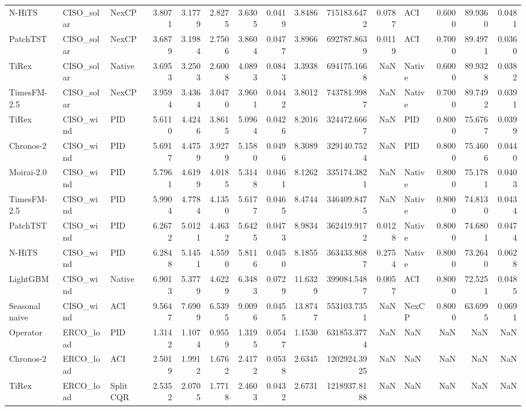 \begin{tabular}{lllrrrrrrrrlrrr}
N-HiTS & CISO_solar & NexCP & 3.8071 & 3.1779 & 2.8275 & 3.6305 & 0.0419 & 3.8486 & 715183.6472 & 0.0787 & ACI & 0.6000 & 89.9360 & 0.0481 \\
PatchTST & CISO_solar & NexCP & 3.6879 & 3.1984 & 2.7506 & 3.8604 & 0.0477 & 3.8966 & 692787.8639 & 0.0119 & ACI & 0.7000 & 89.4971 & 0.0360 \\
TiRex & CISO_solar & Native & 3.6953 & 3.2503 & 2.6008 & 4.0893 & 0.0843 & 3.3938 & 694175.1668 & NaN & Native & 0.6000 & 89.9328 & 0.0382 \\
TimesFM-2.5 & CISO_solar & NexCP & 3.9594 & 3.4364 & 3.0470 & 3.9601 & 0.0442 & 3.8012 & 743781.9987 & NaN & Native & 0.7000 & 89.7492 & 0.0391 \\
TiRex & CISO_wind & PID & 5.6110 & 4.4246 & 3.8615 & 5.0964 & 0.0426 & 8.2016 & 324472.6667 & NaN & PID & 0.8000 & 75.6767 & 0.0399 \\
Chronos-2 & CISO_wind & PID & 5.6917 & 4.4759 & 3.9279 & 5.1580 & 0.0496 & 8.3089 & 329140.7524 & NaN & PID & 0.8000 & 75.4606 & 0.0440 \\
Moirai-2.0 & CISO_wind & PID & 5.7961 & 4.6199 & 4.0185 & 5.3148 & 0.0461 & 8.1262 & 335174.3821 & NaN & Native & 0.8000 & 75.1781 & 0.0403 \\
TimesFM-2.5 & CISO_wind & PID & 5.9904 & 4.7784 & 4.1350 & 5.6177 & 0.0465 & 8.4744 & 346409.8475 & NaN & Native & 0.8000 & 74.8130 & 0.0434 \\
PatchTST & CISO_wind & PID & 6.2672 & 5.0121 & 4.4632 & 5.6425 & 0.0473 & 8.9834 & 362419.9172 & 0.0128 & Native & 0.8000 & 74.6801 & 0.0474 \\
N-HiTS & CISO_wind & PID & 6.2848 & 5.1451 & 4.5590 & 5.8116 & 0.0450 & 8.1855 & 363433.8687 & 0.2754 & Native & 0.8000 & 73.2640 & 0.0628 \\
LightGBM & CISO_wind & Native & 6.9013 & 5.3779 & 4.6229 & 6.3483 & 0.0729 & 11.6329 & 399084.5487 & 0.0057 & ACI & 0.8000 & 72.5251 & 0.0485 \\
Seasonal naive & CISO_wind & ACI & 9.5647 & 7.6909 & 6.5395 & 9.0096 & 0.0455 & 13.8747 & 553103.7351 & NaN & NexCP & 0.8000 & 63.6995 & 0.0691 \\
Operator & ERCO_load & PID & 1.3142 & 1.1074 & 0.9559 & 1.3195 & 0.0547 & 1.1530 & 631853.3774 & NaN & NaN & NaN & NaN & NaN \\
Chronos-2 & ERCO_load & ACI & 2.5019 & 1.9912 & 1.6762 & 2.4172 & 0.0538 & 2.6345 & 1202924.3925 & NaN & NaN & NaN & NaN & NaN \\
TiRex & ERCO_load & Split CQR & 2.5352 & 2.0705 & 1.7718 & 2.4603 & 0.0432 & 2.6731 & 1218937.8188 & NaN & NaN & NaN & NaN & NaN \\

\end{tabular}
